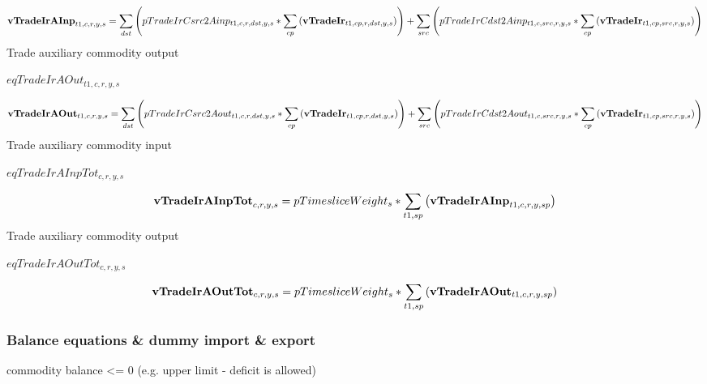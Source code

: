 \documentclass{article}
\begin{document}
\begin{dmath}
{\bf vTradeIrAInp}_{t1,c,r,y,s}  =  \sum_{dst}{\left(pTradeIrCsrc2Ainp_{t1,c,r,dst,y,s}*\sum_{cp}{\left({\bf vTradeIr}_{t1,cp,r,dst,y,s}\right)}\right)}+\sum_{src}{\left(pTradeIrCdst2Ainp_{t1,c,src,r,y,s}*\sum_{cp}{\left({\bf vTradeIr}_{t1,cp,src,r,y,s}\right)}\right)}
\end{dmath}
Trade auxiliary commodity output







$eqTradeIrAOut_{t1,c,r,y,s}$





\begin{dmath}
{\bf vTradeIrAOut}_{t1,c,r,y,s}  =  \sum_{dst}{\left(pTradeIrCsrc2Aout_{t1,c,r,dst,y,s}*\sum_{cp}{\left({\bf vTradeIr}_{t1,cp,r,dst,y,s}\right)}\right)}+\sum_{src}{\left(pTradeIrCdst2Aout_{t1,c,src,r,y,s}*\sum_{cp}{\left({\bf vTradeIr}_{t1,cp,src,r,y,s}\right)}\right)}
\end{dmath}
Trade auxiliary commodity input







$eqTradeIrAInpTot_{c,r,y,s}$





\begin{dmath}
{\bf vTradeIrAInpTot}_{c,r,y,s}  =  pTimesliceWeight_{s}*\sum_{t1,sp}{\left({\bf vTradeIrAInp}_{t1,c,r,y,sp}\right)}
\end{dmath}
Trade auxiliary commodity output







$eqTradeIrAOutTot_{c,r,y,s}$





\begin{dmath}
{\bf vTradeIrAOutTot}_{c,r,y,s}  =  pTimesliceWeight_{s}*\sum_{t1,sp}{\left({\bf vTradeIrAOut}_{t1,c,r,y,sp}\right)}
\end{dmath}
\subsubsection*{Balance equations \& dummy import \& export}
commodity balance <= 0 (e.g. upper limit - deficit is allowed)
\end{document}
